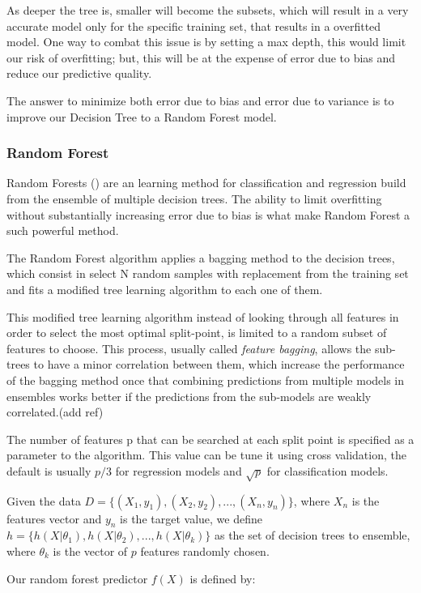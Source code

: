\documentclass[12pt]{report}
\begin{document}
As deeper the tree is, smaller will become the subsets, which will result in a very accurate model only for the specific training set, that results in a overfitted model. One way to combat this issue is by setting a max depth, this would limit our risk of overfitting; but, this will be at the expense of error due to bias and reduce our predictive quality.

The answer to minimize both error due to bias and error due to variance is to improve our Decision Tree to a Random Forest model.

\subsubsection{Random Forest}

Random Forests (\citet{Breiman2001}) are an learning method for classification and regression build from the ensemble of multiple decision trees. The ability to limit overfitting without substantially increasing error due to bias is what make Random Forest a such powerful method.

The Random Forest algorithm applies a bagging method to the decision trees, which consist in select N random samples with replacement from the training set and fits a modified tree learning algorithm to each one of them.

This modified tree learning algorithm instead of looking through all features in order to select the most optimal split-point, is limited to a random subset of features to choose. This process, usually called \textit{feature bagging}, allows the sub-trees to have a minor correlation between them, which increase the performance of the bagging method once that combining predictions from multiple models in ensembles works better if the predictions from the sub-models are weakly correlated.(add ref)

The number of features p that can be searched at each split point is specified as a parameter to the algorithm. This value can be tune it using cross validation, the default is usually $p/3$ for regression models and $\sqrt{p}$ for classification models.

Given the data $D=\{(X_1,y_1), (X_2,y_2), ... ,(X_n, y_n)\}$, where $X_n$ is the features vector and $y_n$ is the target value, we define $h = \{h(X|\theta_1), h(X|\theta_2), ...,h(X|\theta_k)\}$ as the set of decision trees to ensemble, where $\theta_k$ is the vector of $p$ features randomly chosen. 

Our random forest predictor $f(X)$ is defined by:
\end{document}
